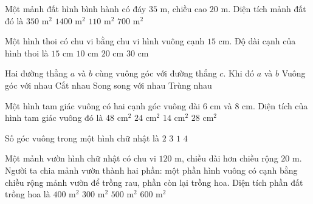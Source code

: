 \begin{ex} %
Một mảnh đất hình bình hành có đáy $35\text{ m}$, chiều cao $20\text{ m}$. Diện tích mảnh đất đó là
\choice
{$350\text{ m}^2$}
{$1400\text{ m}^2$}
{$110\text{ m}^2$}
{\True $700\text{ m}^2$}
\end{ex}

\begin{ex} %
Một hình thoi có chu vi bằng chu vi hình vuông cạnh $15\text{ cm}$. Độ dài cạnh của hình thoi là
\choice
{\True $15\text{ cm}$}
{$10\text{ cm}$}
{$20\text{ cm}$}
{$30\text{ cm}$}
\end{ex}

\begin{ex} %
Hai đường thẳng $a$ và $b$ cùng vuông góc với đường thẳng $c$. Khi đó $a$ và $b$
\choice
{Vuông góc với nhau}
{Cắt nhau}
{\True Song song với nhau}
{Trùng nhau}
\end{ex}

\begin{ex} %
Một hình tam giác vuông có hai cạnh góc vuông dài $6\text{ cm}$ và $8\text{ cm}$. Diện tích của hình tam giác vuông đó là
\choice
{$48\text{ cm}^2$}
{\True $24\text{ cm}^2$}
{$14\text{ cm}^2$}
{$28\text{ cm}^2$}
\end{ex}

\begin{ex} %
Số góc vuông trong một hình chữ nhật là
\choice
{$2$}
{$3$}
{$1$}
{\True $4$}
\end{ex}

\begin{ex} %
Một mảnh vườn hình chữ nhật có chu vi $120\text{ m}$, chiều dài hơn chiều rộng $20\text{ m}$. Người ta chia mảnh vườn thành hai phần: một phần hình vuông có cạnh bằng chiều rộng mảnh vườn để trồng rau, phần còn lại trồng hoa. Diện tích phần đất trồng hoa là
\choice
{\True $400\text{ m}^2$}
{$300\text{ m}^2$}
{$500\text{ m}^2$}
{$600\text{ m}^2$}
\end{ex}

